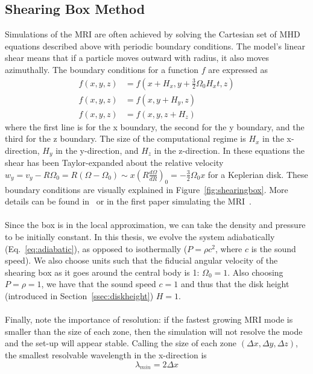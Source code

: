 \subsection{Shearing Box Method}\label{ssec:shearingbox}
Simulations of the MRI are often achieved by solving the Cartesian set of MHD equations described above with periodic boundary conditions. The model's linear shear means that if a particle moves outward with radius, it also moves azimuthally. The boundary conditions for a function $f$ are expressed as
\begin{align}
  f(x,y,z)&=f(x+H_x,y+\frac32\Omega_0H_xt,z)\label{eq:bcx}\\
  f(x,y,z)&=f(x,y+H_y,z)\label{eq:bcy}\\
  f(x,y,z)&=f(x,y,z+H_z)\label{eq:bcz}
\end{align}
where the first line is for the x boundary, the second for the y boundary, and the third for the z boundary. The size of the computational regime is $H_x$ in the x-direction, $H_y$ in the y-direction, and $H_z$ in the z-direction. In these equations the shear has been Taylor-expanded about the relative velocity $w_y=v_y-R\Omega_0=R(\Omega-\Omega_0)\sim x\left(R\frac{d\Omega}{dR}\right)_0=-\frac32\Omega_0x$ for a Keplerian disk. These boundary conditions are visually explained in Figure~\ref{fig:shearingbox}. More details can be found in~\citet{BH1998} or in the first paper simulating the MRI~\cite{BH1991c}. \\
\\
Since the box is in the local approximation, we can take the density and pressure to be initially constant. In this thesis, we evolve the system adiabatically (Eq.~\ref{eq:adiabatic}), as opposed to isothermally ($P=\rho c^2$, where $c$ is the sound speed). We also choose units such that the fiducial angular velocity of the shearing box as it goes around the central body is 1: $\Omega_0=1$. Also choosing $P=\rho=1$, we have that the sound speed $c=1$ and thus that the disk height (introduced in Section~\ref{ssec:diskheight}) $H=1$. \\
\\
Finally, note the importance of resolution: if the fastest growing MRI mode is smaller than the size of each zone, then the simulation will not resolve the mode and the set-up will appear stable. Calling the size of each zone $(\Delta x,\Delta y,\Delta z)$, the smallest resolvable wavelength in the x-direction is
\begin{equation*}
  \lambda_{min}=2\Delta x
\end{equation*}

